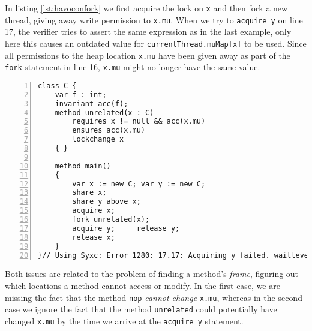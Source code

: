 In listing \ref{lst:havoconfork} we first acquire the lock on \lstinline!x! and then fork a new thread, giving away write permission to \lstinline!x.mu!.
When we try to \lstinline!acquire y! on line 17, the verifier tries to assert the same expression as in the last example, only here this causes an outdated value for \lstinline!currentThread.muMap[x]! to be used. 
Since all permissions to the heap location \lstinline!x.mu! have been given away as part of the \lstinline[language=Chalice]!fork! statement in line 16, \lstinline!x.mu! might no longer have the same value.

\begin{lstlisting}[float,caption={Keeping too much information about \lstinline!mu!.},label=lst:havoconfork,language=chalice,numbers=left]
class C {
    var f : int;
    invariant acc(f);
    method unrelated(x : C)
        requires x != null && acc(x.mu)
        ensures acc(x.mu)
        lockchange x
    { }

    method main()
    {
        var x := new C; var y := new C;
        share x;
        share y above x;
        acquire x;
        fork unrelated(x);
        acquire y;     release y;
        release x;
    }
}// Using Syxc: Error 1280: 17.17: Acquiring y failed. waitlevel << mu might not hold.
\end{lstlisting}

Both issues are related to the problem of finding a method's \emph{frame}, figuring out which locations a method cannot access or modify.
In the first case, we are missing the fact that the method \lstinline!nop! \emph{cannot change} \lstinline!x.mu!, whereas in the second case we ignore the fact that the method \lstinline!unrelated! could potentially have changed \lstinline!x.mu! by the time we arrive at the \lstinline[language=Chalice]!acquire y! statement.